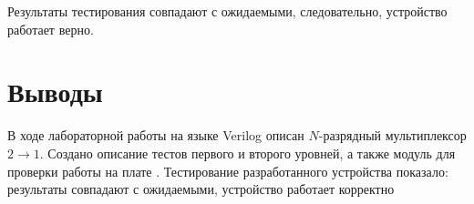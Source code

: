 Результаты тестирования совпадают с ожидаемыми, следовательно, устройство работает верно.
 
\section{Выводы}

В ходе лабораторной работы на языке Verilog описан $N$-разрядный мультиплексор $2 \rightarrow 1$. Создано описание тестов первого и второго уровней, а также модуль для проверки работы на плате . Тестирование разработанного устройства показало: результаты совпадают с ожидаемыми, устройство работает корректно

